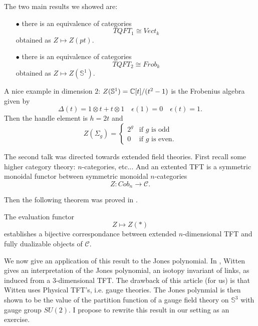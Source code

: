 The two main results we showed are:\\

\begin{itemize}
\item[$\bullet$] there is an equivalence of categories 
\[TQFT_1 \cong Vect_k \]
obtained as $Z \mapsto Z(pt)$.
\item[$\bullet$] there is an equivalence of categories 
\[TQFT_2 \cong Frob_k  \]
obtained as $Z \mapsto Z(\mathbb S^1)$.\\
\end{itemize}

A nice example in dimension $2$: $Z(\mathbb S^1)=\mathbb C [t]/ (t^2 -1 )$ is the Frobenius algebra given by
\[\Delta(t) = 1\otimes t + t\otimes 1 \quad \epsilon(1)=0 \quad \epsilon (t) =1.\]
Then the handle element is $h=2t$ and
\[ Z(\Sigma_g) = \left\{\begin{array}{ll} 
2^g & \text{if }g\text{ is odd} \\
0 & \text{if }g\text{ is even.}
\end{array}\right.\]  

The second talk was directed towards extended field theories. First recall some higher category theory: $n$-categories, etc... And an extented TFT is a symmetric monoidal functor between symmetric monoidal $n$-categories
\[Z : Cob_n \rightarrow \mathcal C.\]

Then the following theorem was proved in \cite{Lurie}.

\begin{thm}
The evaluation functor \[ Z \mapsto Z(*)\] establishes a bijective correspondance between extended $n$-dimensional TFT and fully dualizable objects of $\mathcal C$. 
\end{thm}

We now give an application of this result to the Jones polynomial. In \cite{WittenJones}, Witten gives an interpretation of the Jones polynomial, an isotopy invariant of links, as induced from a $3$-dimensional TFT. The drawback of this article (for us) is that Witten uses Physical TFT's, i.e. gauge theories. The Jones polynmial is then shown to be the value of the partition function of a gauge field theory on $\mathbb S^3$ with gauge group $SU(2)$. I propose to rewrite this result in our setting as an exercise. \\  

